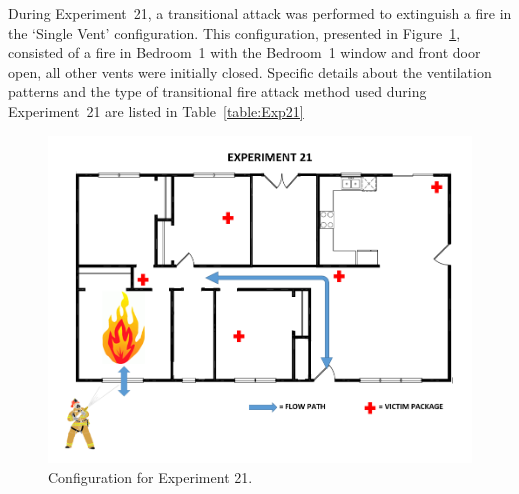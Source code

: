 \documentclass[12pt,oneside]{book}
\begin{document}
\FloatBarrier

During Experiment~21, a transitional attack was performed to extinguish a fire in the `Single Vent' configuration. This configuration, presented in Figure~\ref{fig:Single_Vent_ext_alt1}, consisted of a fire in Bedroom~1 with the Bedroom~1 window and front door open, all other vents were initially closed. Specific details about the ventilation patterns and the type of transitional fire attack method used during Experiment~21 are listed in Table~\ref{table:Exp21}

\begin{figure}[H]
	\centering
	\includegraphics[width=5in]{Figures/General/Exp21.png}
	\caption{Configuration for Experiment 21.}
	\label{fig:Single_Vent_ext_alt1}
\end{figure}

\begin{table}[H]
\caption{Experiment 21}
\centering
{}
\label{table:Exp21}
\end{table}
\end{document}

